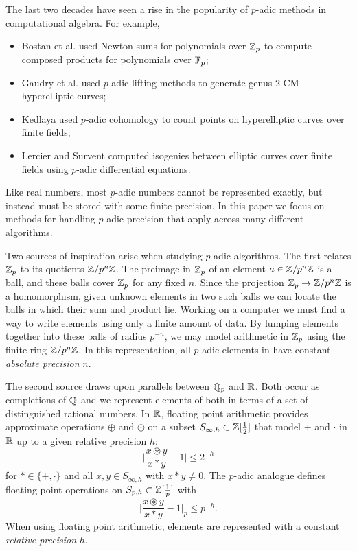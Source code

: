 \documentclass{lms}
\begin{document}
The last two decades have seen a rise in the popularity of $p$-adic methods in
computational algebra.  For example,
\begin{itemize}
\item Bostan et al. \cite{boston-gonzalez-perdry-schost:05a} used Newton sums for polynomials over $\mathbb Z_p$ to compute composed products for polynomials over $\mathbb{F}_p$;
\item Gaudry et al. \cite{gaudry-houtmann-weng-ritzenthaler-kohel:06a} used $p$-adic lifting methods to generate genus 2 CM hyperelliptic curves;
\item Kedlaya \cite{kedlaya:01a} used $p$-adic cohomology to count points on hyperelliptic curves over finite fields;
\item Lercier and Survent \cite{lercier-sirvent:08a} computed isogenies between elliptic curves over finite fields using $p$-adic differential equations.
\end{itemize}
Like real numbers, most $p$-adic numbers cannot be represented exactly, but instead must be
stored with some finite precision.  In this paper we focus on methods for handling $p$-adic precision
that apply across many different algorithms.

Two sources of inspiration arise when studying $p$-adic algorithms.
The first relates $\mathbb Z_p$ to its quotients $\mathbb Z/p^n\mathbb Z$.  The preimage in
$\mathbb Z_p$ of an element $a \in \mathbb Z / p^n \mathbb Z$ is a ball, and these balls cover
$\mathbb Z_p$ for any fixed $n$.  Since the projection $\mathbb Z_p \to \mathbb Z/p^n\mathbb Z$ is a
homomorphism, given unknown elements in two such balls we can
locate the balls in which their sum and product lie.  Working on a computer
we must find a way to write elements using only a finite amount of data.
By lumping elements together into these balls of radius $p^{-n}$, we may
model arithmetic in $\mathbb Z_p$ using the finite ring $\mathbb Z / p^n \mathbb Z$.  In this representation,
all $p$-adic elements in have constant \emph{absolute precision} $n$.

The second source draws upon parallels between $\mathbb Q_p$ and $\mathbb R$.  Both
occur as completions of $\mathbb Q$ and we represent elements of both in terms
of a set of distinguished rational numbers.
In $\mathbb R$, floating point arithmetic provides approximate operations $\oplus$ and $\odot$ on a
subset $S_{\infty,h} \subset \mathbb Z[\frac12]$ that model $+$ and $\cdot$ in $\mathbb R$ up to a given relative precision $h$:
\[
\lvert \frac{x \circledast y}{x \ast y} - 1 \rvert \le 2^{-h}
\]
for $\ast \in \{+, \cdot\}$ and all $x, y \in S_{\infty,h}$ with $x \ast y \ne 0$.  The $p$-adic analogue
defines floating point operations on $S_{p,h} \subset \mathbb Z[\frac1p]$ with
\[
\lvert \frac{x \circledast y}{x \ast y} - 1 \rvert_p \le p^{-h}.
\]
When using floating point arithmetic, elements are represented with a constant \emph{relative precision} $h$.
\end{document}
